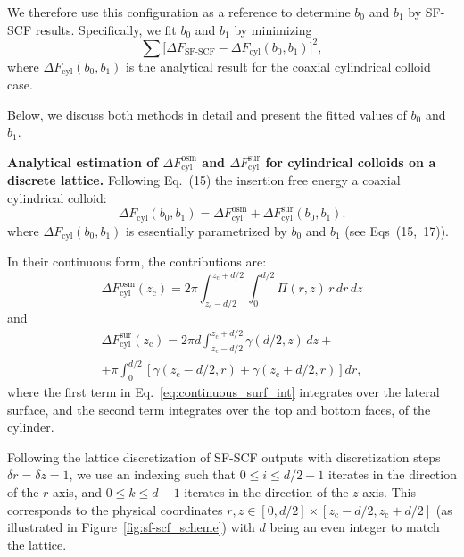 \documentclass[10pt, a4paper, twocolumn]{article}
\begin{document}
We therefore use this configuration as a reference to determine $b_0$ and $b_1$ by SF-SCF results.
Specifically, we fit $b_0$ and $b_1$ by minimizing 
\begin{equation}
    \sum \bigl[\Delta F_{\text{SF-SCF}} - \Delta F_{\text{cyl}}(b_0,b_1)\bigr]^2,
    \label{eq:b0_b1_fit}
\end{equation}
where $\Delta F_{\text{cyl}}(b_0,b_1)$ is the analytical result for the coaxial cylindrical colloid case.

Below, we discuss both methods in detail and present the fitted values of $b_0$ and $b_1$.


\bigskip\noindent
\textbf{Analytical estimation of $\Delta F_{\text{cyl}}^{\text{osm}}$ and $\Delta F_{\text{cyl}}^{\text{sur}}$ for cylindrical colloids on a discrete lattice.}
Following Eq.~(15) the insertion free energy a coaxial cylindrical colloid:
\begin{equation}
    \Delta F_{\text{cyl}}(b_0, b_1) = \Delta F_{\text{cyl}}^{\text{osm}} + \Delta F_{\text{cyl}}^{\text{sur}}(b_0, b_1).
\end{equation}
where $\Delta F_{\text{cyl}}(b_0, b_1)$ is essentially parametrized by $b_0$ and $b_1$ (see Eqs~(15,~17)).

In their continuous form, the contributions are:
\begin{equation}
    \Delta F_{\text{cyl}}^{\text{osm}}(z_{\text{c}}) = 2 \pi \int_{z_{\text{c}} - d/2}^{z_{\text{c}} + d/2} \int_{0}^{d/2} \Pi(r,z) \, r \, dr \, dz
\end{equation}
and
\begin{equation}\label{eq:continuous_surf_int}
    \begin{aligned}
        \Delta F_{\text{cyl}}^{\text{sur}}(z_{\text{c}}) = 2 \pi d \int_{z_{\text{c}} - d/2}^{z_{\text{c}} + d/2} \gamma(d/2,z) \, dz +\\
        + \pi \int_{0}^{d/2} \left[ \gamma(z_{\text{c}} - d/2, r) + \gamma(z_{\text{c}} + d/2,r) \right] dr,
    \end{aligned}
\end{equation}
where the first term in Eq.~\eqref{eq:continuous_surf_int} integrates over the lateral surface, and the second term integrates over the top and bottom faces, of the cylinder.

Following the lattice discretization of SF-SCF outputs with discretization steps $\delta r = \delta z = 1$, we use an indexing such that $0 \le i \le d/2-1$ iterates in the direction of the $r$-axis, and $0 \le k \le d-1$ iterates in the direction of the $z$-axis.
This corresponds to the physical coordinates $r,z \in [0, d/2]\times[z_{\text{c}} - d/2, z_{\text{c}} + d/2]$ (as illustrated in Figure~\ref{fig:sf-scf_scheme}) with $d$ being an even integer to match the lattice.
\end{document}
